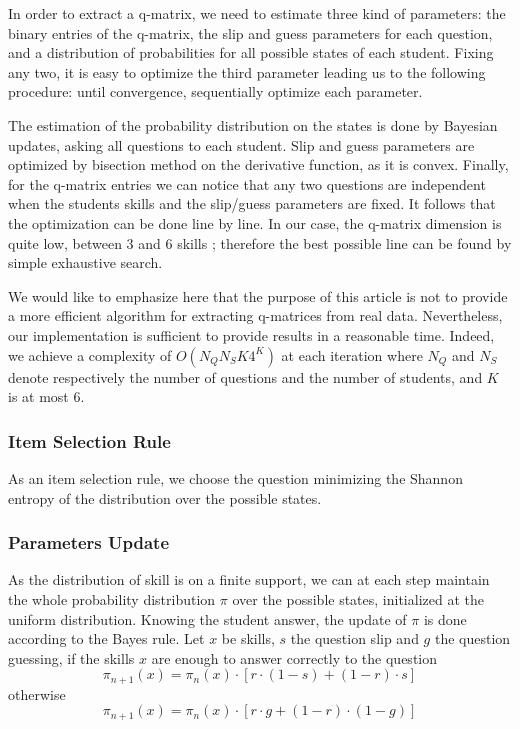 \documentclass{sig-alternate}
\newcommand\alert[1]{\textcolor{red}{#1}}
\begin{document}
In order to extract a q-matrix, we need to estimate three kind of parameters: the binary entries of the q-matrix, the slip and guess parameters for each question, and a distribution of probabilities for all possible states of each student. Fixing any two, it is easy to optimize the third parameter leading us to the following procedure: until convergence, sequentially optimize each parameter.

The estimation of the probability distribution on the states is done by Bayesian updates, asking all questions to each student. Slip and guess parameters are optimized by bisection method on the derivative function, as it is convex. Finally, for the q-matrix entries we can notice that any two questions are independent when the students skills and the slip/guess parameters are fixed. It follows that the optimization can be done line by line. In our case, the q-matrix dimension is quite low, between 3 and 6 skills ; therefore the best possible line can be found by simple exhaustive search.


We would like to emphasize here that the purpose of this article is not to provide a more efficient algorithm for extracting q-matrices from real data. Nevertheless, our implementation is sufficient to provide results in a reasonable time. Indeed, we achieve a complexity of $O(N_Q N_S K 4^K)$ at each iteration where $N_Q$ and $N_S$ denote respectively the number of questions and the number of students, and $K$ is at most 6.

\subsubsection{Item Selection Rule}

As an item selection rule, we choose the question minimizing the Shannon entropy of the distribution over the possible states.

\subsubsection{Parameters Update}

As the distribution of skill is on a finite support, we can at each step maintain the whole probability distribution $\pi$ over the possible states, initialized at the uniform distribution.
Knowing the student answer, the update of $\pi$ is done according to the Bayes rule. Let $x$ be skills, $s$ the question slip and $g$ the question guessing, if the skills $x$ are enough to answer correctly to the question
\[ \pi_{n+1}(x) = \pi_n(x) \cdot [r\cdot(1-s) + (1-r)\cdot s] \]
otherwise
\[ \pi_{n+1}(x) = \pi_n(x) \cdot [r\cdot g + (1-r)\cdot(1-g)] \]
\end{document}

